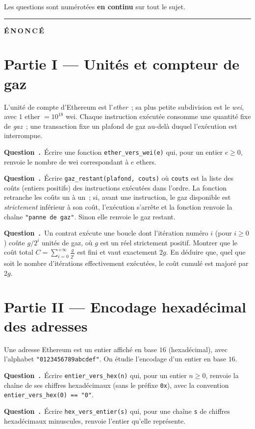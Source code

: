 \documentclass[11pt,a4paper]{article}
\newcounter{qcnt}
\newcommand{\Q}{\medskip\par\stepcounter{qcnt}\noindent\textbf{Question~\theqcnt.}~}
\newcommand{\code}[1]{\lstinline!#1!}
\begin{document}
\noindent Les questions sont numérotées \textbf{en continu} sur tout le sujet.

\bigskip
\hrule
\bigskip
{\Large\bfseries É\,N\,O\,N\,C\,É}
\medskip

\section*{Partie I --- Unités et compteur de gaz}

L'unité de compte d'Ethereum est l'\emph{ether}~; sa plus petite subdivision est le \emph{wei},
avec $1$ ether $= 10^{18}$ wei. Chaque instruction exécutée consomme une quantité fixe de
\emph{gaz}~; une transaction fixe un plafond de gaz au-delà duquel l'exécution est interrompue.

\Q Écrire une fonction \code{ether_vers_wei(e)} qui, pour un entier $e \ge 0$, renvoie le nombre
de wei correspondant à $e$ ethers.

\Q Écrire \code{gaz_restant(plafond, couts)} où \code{couts} est la liste des coûts (entiers
positifs) des instructions exécutées dans l'ordre. La fonction retranche les coûts un à un~; si,
avant une instruction, le gaz disponible est \emph{strictement} inférieur à son coût, l'exécution
s'arrête et la fonction renvoie la chaîne \code{"panne de gaz"}. Sinon elle renvoie le gaz restant.

\Q Un contrat exécute une boucle dont l'itération numéro $i$ (pour $i \ge 0$) coûte $g/2^{i}$
unités de gaz, où $g$ est un réel strictement positif. Montrer que le coût total
$\displaystyle C = \sum_{i=0}^{+\infty} \frac{g}{2^{i}}$ est fini et vaut exactement $2g$. En
déduire que, quel que soit le nombre d'itérations effectivement exécutées, le coût cumulé est
majoré par $2g$.

\section*{Partie II --- Encodage hexadécimal des adresses}

Une adresse Ethereum est un entier affiché en base $16$ (hexadécimal), avec l'alphabet
\code{"0123456789abcdef"}. On étudie l'encodage d'un entier en base $16$.

\Q Écrire \code{entier_vers_hex(n)} qui, pour un entier $n \ge 0$, renvoie la chaîne de ses
chiffres hexadécimaux (sans le préfixe \code{0x}), avec la convention \code{entier_vers_hex(0) == "0"}.

\Q Écrire \code{hex_vers_entier(s)} qui, pour une chaîne \code{s} de chiffres hexadécimaux
minuscules, renvoie l'entier qu'elle représente.
\end{document}
